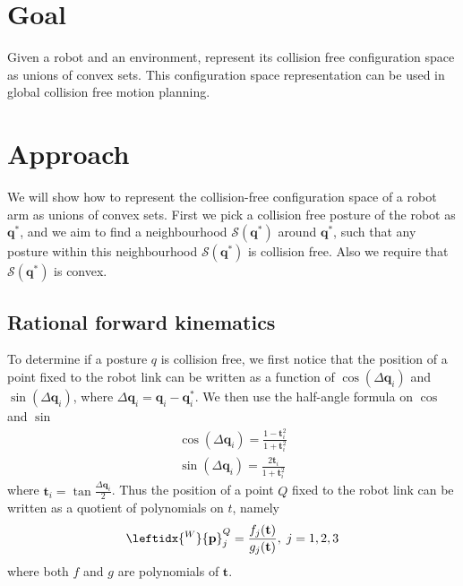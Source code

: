 \documentclass{article}
\renewcommand{\vec}[1]{\mathbf{#1}}
\begin{document}
\section{Goal}
Given a robot and an environment, represent its collision free configuration space as unions of convex sets. This configuration space representation can be used in global collision free motion planning.
\section{Approach}
We will show how to represent the collision-free configuration space of a robot arm as unions of convex sets. First we pick a collision free posture of the robot as $\vec{q}^*$, and we aim to find a neighbourhood $\mathcal{S}(\vec{q}^*)$ around $\vec{q}^*$, such that any posture within this neighbourhood $\mathcal{S}(\vec{q}^*)$ is collision free. Also we require that $\mathcal{S}(\vec{q}^*)$ is convex.

\subsection{Rational forward kinematics}
\label{subsubsection:rational_forward_kinematics}
To determine if a posture $q$ is collision free, we first notice that the position of a point fixed to the robot link can be written as a function of $\cos(\Delta \vec{q}_i)$ and $\sin(\Delta \vec{q}_i)$, where $\Delta \vec{q}_i = \vec{q}_i - \vec{q}^*_i$. We then use the half-angle formula on $\cos$ and $\sin$
\begin{align}
	\cos(\Delta \vec{q}_i) = \frac{1 - \vec{t}_i^2}{1 + \vec{t}_i^2}\\
	\sin(\Delta \vec{q}_i) = \frac{2\vec{t}_i}{1 + \vec{t}_i^2}
\end{align}
where $\vec{t}_i = \tan\frac{\Delta \vec{q}_i}{2}$. Thus the position of a point $Q$ fixed to the robot link can be written as a quotient of polynomials on $t$, namely
\begin{align}
	\leftidx{^W}{\vec{p}}^{Q}_{j} = \frac{f_j(\vec{t})}{g_j(\vec{t})}, \; j = 1, 2, 3 \label{eq:position_quotient_polynomial}
\end{align}
where both $f$ and $g$ are polynomials of $\vec{t}$.
\end{document}
